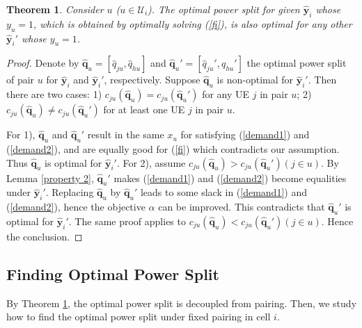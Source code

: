 \documentclass[10pt,journal,final,finalsubmission,twocolumn]{IEEEtran}
\newtheorem{theorem}{Theorem}
\begin{document}
\begin{theorem}\label{decouple}
Consider $u$ ($u\in \mathcal{U}_i$). The optimal power split for given $\hat{\boldsymbol{y}}_i$ whose $y_u=1$, which is obtained by optimally solving (\ref{fi}), is also optimal for any other $\hat{\boldsymbol{y}}_i'$ whose $y_u=1$.
\end{theorem}
\begin{proof}
Denote by $\hat{\boldsymbol{q}}_u=[\hat{q}_{ju},\hat{q}_{hu}]$ and $\hat{\boldsymbol{q}}_u'=[\hat{q}_{ju}',\hat{q}_{hu}']$ the optimal power split of pair $u$ for $\hat{\boldsymbol{y}}_i$ and $\hat{\boldsymbol{y}}_i'$, respectively. Suppose $\hat{\boldsymbol{q}}_u$ is non-optimal for $\hat{\boldsymbol{y}}_i'$. Then there are two cases: 1) $c_{ju}\left ( \hat{\boldsymbol{q}}_u \right ) = c_{ju}\left ( {\hat{\boldsymbol{q}}_u}' \right )$ for any UE $j$ in pair $u$; 2) $c_{ju}\left ( {\hat{\boldsymbol{q}}_u} \right ) \neq c_{ju}\left ( {\hat{\boldsymbol{q}}_u}' \right )$ for at least one UE $j$ in pair $u$.

For 1), ${\hat{\boldsymbol{q}}_u}$ and ${\hat{\boldsymbol{q}}_u}'$ result in the same $x_u$ for satisfying (\ref{demand1}) and (\ref{demand2}), and are equally good for (\ref{fi}) which contradicts our assumption. Thus ${\hat{\boldsymbol{q}}_u}$ is optimal for $\hat{\boldsymbol{y}}_i'$. For 2), assume $c_{ju}\left ( {\hat{\boldsymbol{q}}_u} \right ) > c_{ju}\left ( {\hat{\boldsymbol{q}}_u}' \right )\left (j\in u\right)$. By Lemma \ref{property 2}, ${\hat{\boldsymbol{q}}_u}'$ makes (\ref{demand1}) and (\ref{demand2}) become equalities under $\hat{\boldsymbol{y}}_i'$. Replacing $\hat{\boldsymbol{q}}_u$ by $\hat{\boldsymbol{q}}_u'$ leads to some slack in (\ref{demand1}) and (\ref{demand2}), hence the objective $\alpha$ can be improved. This contradicts that $\hat{\boldsymbol{q}}_u'$ is optimal for $\hat{\boldsymbol{y}}_i'$. The same proof applies to $c_{ju}\left ( \hat{\boldsymbol{q}}_u \right ) < c_{ju}\left (\hat{\boldsymbol{q}}_u' \right )\left (j\in u\right)$. Hence the conclusion.
\end{proof}

\subsection{Finding Optimal Power Split}\label{OptimalPowerSplit}

By Theorem \ref{decouple}, the optimal power split is decoupled from pairing. Then, we study how to find the optimal power split under fixed pairing in cell $i$. 
\end{document}
